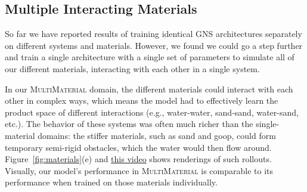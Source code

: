 \documentclass{article}
\newcommand\figref[1]{Figure~\ref{#1}}
\newcommand\domain[1]{\textsc{#1}}
\newcommand\vidmulti[1]{\href{http://tny.sh/bf5FJnN}{#1}}
\begin{document}
\subsection{Multiple Interacting Materials}
\label{sec:results:multiple}

So far we have reported results of training identical GNS architectures separately on different systems and materials. However, we found we could go a step further and train a single architecture with a single set of parameters to simulate all of our different materials, interacting with each other in a single system.

In our \domain{MultiMaterial} domain, the different materials could interact with each other in complex ways, which means the model had to effectively learn the product space of different interactions (e.g., water-water, sand-sand, water-sand, etc.). The behavior of these systems was often much richer than the single-material domains: the stiffer materials, such as sand and goop, could form temporary semi-rigid obstacles, which the water would then flow around. \figref{fig:materials}(e) and \vidmulti{this video} shows renderings of such rollouts.
Visually, our model's performance in \domain{MultiMaterial} is comparable to its performance when trained on those materials individually. 



%
%
%
%
%
%
%
%
%
%
%
%
%
  
%
%
%
%
\end{document}
